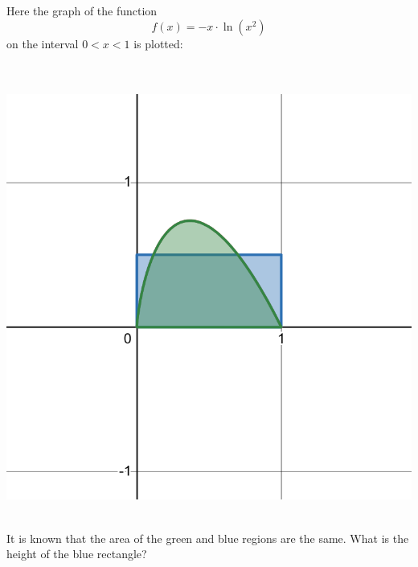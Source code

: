 \medskip


\begin{problem}
Here the graph of the function $$f(x) = -x \cdot \ln (x^2)$$ 
on the interval $0 < x < 1$ is plotted:
\begin{center}
\\~\\
\includegraphics[width=0.5\linewidth]{figs/equal_areas.png}
\\~\\
\end{center}
It is known that the area of the green and blue regions  are the same. What is the height of the blue rectangle?

    
\end{problem}






    



        
        